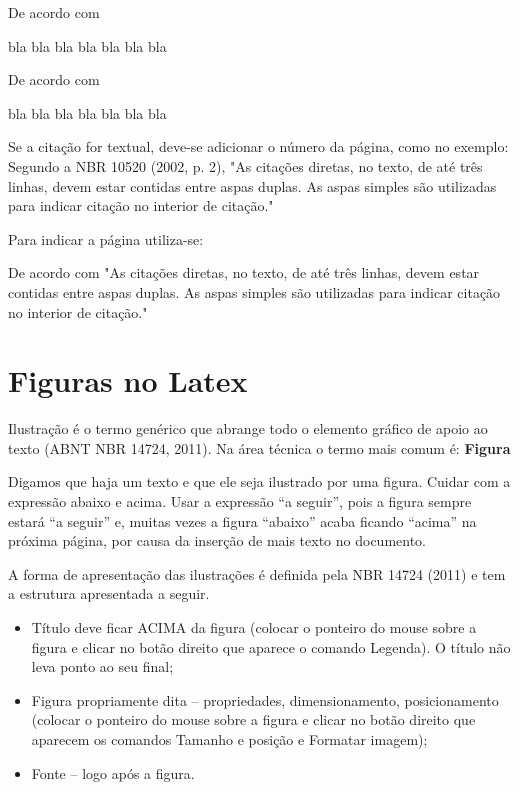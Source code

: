 De acordo com 

bla bla bla bla bla bla bla \cite{lu2017industry}

De acordo com 

bla bla bla bla bla bla bla \cite{sacomano2018industria}


Se a citação for textual, deve-se adicionar o número da página, como no exemplo: Segundo a NBR 10520 (2002, p. 2), "As citações diretas, no texto, de até três linhas, devem estar contidas entre aspas duplas. As aspas simples são utilizadas para indicar citação no interior de citação."

Para indicar a página utiliza-se: 

De acordo com  "As citações diretas, no texto, de até três linhas, devem estar contidas entre aspas duplas. As aspas simples são utilizadas para indicar citação no interior de citação."

\section{Figuras no Latex}

Ilustração é o termo genérico que abrange todo o elemento gráfico de apoio ao texto (ABNT NBR 14724, 2011). Na área técnica o termo mais comum é: \textbf{Figura}

Digamos que haja um texto e que ele seja ilustrado por uma figura. Cuidar com a expressão abaixo e acima. Usar a expressão “a seguir”, pois a figura sempre estará “a seguir” e, muitas vezes a figura “abaixo” acaba ficando “acima” na próxima página, por causa da inserção de mais texto no documento.

A forma de apresentação das ilustrações é definida pela NBR 14724 (2011) e tem a estrutura apresentada a seguir.

\begin{itemize}
    \item Título deve ficar ACIMA da figura (colocar o ponteiro do mouse sobre a figura e clicar no botão direito que aparece o comando Legenda). O título não leva ponto ao seu final;
    \item Figura propriamente dita – propriedades, dimensionamento, posicionamento (colocar o ponteiro do mouse sobre a figura e clicar no botão direito que aparecem os comandos Tamanho e posição e Formatar imagem);
    \item Fonte – logo após a figura.
\end{itemize}

